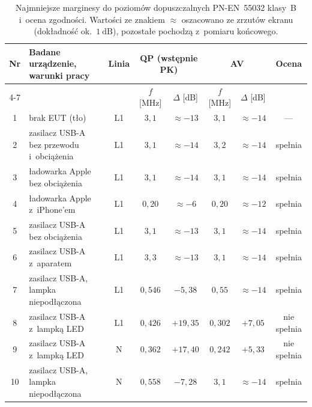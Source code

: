 \documentclass[11pt,a4paper]{article}
\begin{document}
\begin{table}[H]
  \centering
  \small
  \caption{Najmniejsze marginesy do poziomów dopuszczalnych PN-EN~55032 klasy~B i~ocena
           zgodności. Wartości ze znakiem $\approx$ oszacowano ze zrzutów ekranu (dokładność
           ok.~$1\ \mathrm{dB}$), pozostałe pochodzą z~pomiaru końcowego.}
  \label{tab:zestawienie}
  \renewcommand{\arraystretch}{1.15}
  \setlength{\tabcolsep}{4pt}
  \begin{tabular}{|c|>{\raggedright\arraybackslash}p{5.6cm}|c|c|c|c|c|c|}
    \hline
    \textbf{Nr} & \textbf{Badane urządzenie, warunki pracy} & \textbf{Linia} &
      \multicolumn{2}{c|}{\textbf{QP} (wstępnie PK)} & \multicolumn{2}{c|}{\textbf{AV}} & \textbf{Ocena} \\
    \cline{4-7}
     & & & $f$ [MHz] & $\Delta$ [dB] & $f$ [MHz] & $\Delta$ [dB] & \\
    \hline
    1  & brak EUT (tło) & L1 & $3{,}1$ & $\approx -13$ & $3{,}1$ & $\approx -14$ & --- \\ \hline
    2  & zasilacz USB-A bez przewodu i~obciążenia & L1 & $3{,}1$ & $\approx -14$ & $3{,}2$ & $\approx -14$ & spełnia \\ \hline
    3  & ładowarka Apple bez obciążenia & L1 & $3{,}1$ & $\approx -14$ & $3{,}1$ & $\approx -14$ & spełnia \\ \hline
    4  & ładowarka Apple z~iPhone'em & L1 & $0{,}20$ & $\approx -6$ & $0{,}20$ & $\approx -12$ & spełnia \\ \hline
    5  & zasilacz USB-A bez obciążenia & L1 & $3{,}1$ & $\approx -13$ & $3{,}1$ & $\approx -14$ & spełnia \\ \hline
    6  & zasilacz USB-A z~aparatem & L1 & $3{,}3$ & $\approx -13$ & $3{,}1$ & $\approx -14$ & spełnia \\ \hline
    7  & zasilacz USB-A, lampka niepodłączona & L1 & $0{,}546$ & $-5{,}38$ & $0{,}55$ & $\approx -14$ & spełnia \\ \hline
    8  & zasilacz USB-A z~lampką LED & L1 & $0{,}426$ & $+19{,}35$ & $0{,}302$ & $+7{,}05$ & nie spełnia \\ \hline
    9  & zasilacz USB-A z~lampką LED & N  & $0{,}362$ & $+17{,}40$ & $0{,}242$ & $+5{,}33$ & nie spełnia \\ \hline
    10 & zasilacz USB-A, lampka niepodłączona & N  & $0{,}558$ & $-7{,}28$ & $3{,}1$ & $\approx -14$ & spełnia \\ \hline
  \end{tabular}
\end{table}
\end{document}
